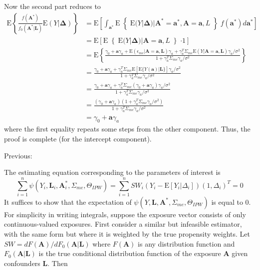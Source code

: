 \documentclass[12pt]{article}
\begin{document}
Now the second part reduces to
\begin{align*}
\text{E} \left \{ \frac{f(\bm{A}^{*})}{f_{0}(\bm{A}^{*} | \bm{L})} \text{E}(Y | \bm{\Delta}) \right \} &= \text{E} \left[ \int_{\bm{a}^{*}} \text{E} \middle\{ \text{E}(Y | \bm{\Delta}) |  \bm{A}^{*} = \bm{a}^{*}, \bm{A} = \bm{a}, L \middle\} f(\bm{a}^{*}) d\bm{a}^{*} \right ] \\
&= \text{E} \left [ \text{E} \middle\{ \text{E}(Y | \bm{\Delta}) | \bm{A} = \bm{a}, L \middle\} \cdot 1 \right ] \\
&= \text{E} \left \{ \frac{\gamma_{0} + \bm{a}\gamma_{a} + \text{E}(\epsilon_{me} | \bm{A} = \bm{a}, \bm{L})\gamma_{a} + \gamma_{a}^{T}\Sigma_{me}\text{E}(Y | \bm{A} = \bm{a}, \bm{L})\gamma_{a} / \sigma^{2}}{1 + \gamma_{a}^{T}\Sigma_{me}\gamma_{a} / \sigma^{2}} \right \} \\
&= \frac{\gamma_{0} + \bm{a}\gamma_{a} + \gamma_{a}^{T}\Sigma_{me}\text{E} [ \text{E}\{ Y(\bm{a}) | \bm{L}\} ] \gamma_{a} / \sigma^{2}}{1 + \gamma_{a}^{T}\Sigma_{me}\gamma_{a} / \sigma^{2}} \\
&= \frac{\gamma_{0} + \bm{a}\gamma_{a} + \gamma_{a}^{T}\Sigma_{me}(\gamma_{0} + \bm{a}\gamma_{a}) \gamma_{a} / \sigma^{2}}{1 + \gamma_{a}^{T}\Sigma_{me}\gamma_{a} / \sigma^{2}} \\
&= \frac{(\gamma_{0} + \bm{a}\gamma_{a})(1 + \gamma_{a}^{T}\Sigma_{me}\gamma_{a} / \sigma^{2})}{1 + \gamma_{a}^{T}\Sigma_{me}\gamma_{a} / \sigma^{2}} \\
&= \gamma_{0} + \bm{a}\gamma_{a}
\end{align*}
where the first equality repeats some steps from the other component. Thus, the proof is complete (for the intercept component).

\vspace{10cm}

Previous:

The estimating equation corresponding to the parameters of interest is
\begin{equation*}
\sum_{i=1}^{n} \psi(Y_{i}, \bm{L}_{i}, \bm{A}^{*}_{i}, \Sigma_{me}, \Theta_{IPW}) = \sum_{i=1}^{n} SW_{i}(Y_{i} - \text{E}[Y_{i} | \Delta_{i}])(1, \Delta_{i})^{T} = 0
\end{equation*}
It suffices to show that the expectation of $\psi(Y, \bm{L}, \bm{A}^{*}, \Sigma_{me}, \Theta_{IPW})$ is equal to 0. For simplicity in writing integrals, suppose the exposure vector consists of only continuous-valued exposures. First consider a similar but infeasible estimator, with the same form but where it is weighted by the true propensity weights. Let $SW = dF(\bm{A}) / dF_0(\bm{A} | \bm{L})$ where $F(\bm{A})$ is any distribution function and $F_0(\bm{A} | \bm{L})$ is the true conditional distribution function of the exposure $\bm{A}$ given confounders $\bm{L}$. Then
\end{document}
